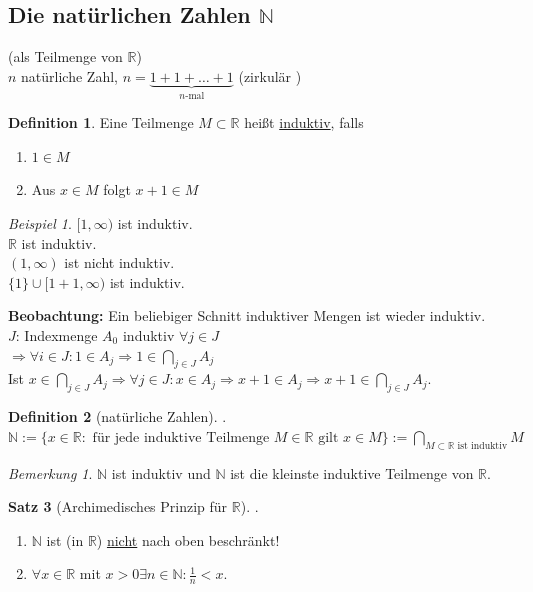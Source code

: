 \documentclass[12pt,a4paper,titlepage]{article} %
\theoremstyle{definition}
\newtheorem{satz}{Satz}[subsection]
\newtheorem{defi}[satz]{Definition}
\theoremstyle{remark}
\newtheorem*{bem}{Bemerkung}
\newtheorem*{bsp}{Beispiel}
\begin{document}
\subsection{Die natürlichen Zahlen $\mathbb{N}$}
(als Teilmenge von $\mathbb{R}$)\\
$n$ natürliche Zahl, $n=\underbrace{1+1+\ldots + 1}_{n\text{-mal}}$ (zirkulär \Lightning)
\begin{defi}
	Eine Teilmenge $M\subset \mathbb{R}$ heißt \underline{induktiv}, falls
	\begin{enumerate}
		\item $1\in M$
		\item Aus $x\in M$ folgt $x+1 \in M$
	\end{enumerate}
\end{defi}
\begin{bsp}
	$[1,\infty)$ ist induktiv.\\
	$\mathbb{R}$ ist induktiv.\\
	$(1,\infty)$ ist nicht induktiv.\\
	$\{1\} \cup [1+1,\infty)$ ist induktiv.
\end{bsp}
\textbf{Beobachtung:} Ein beliebiger Schnitt induktiver Mengen ist wieder induktiv.\\
$J$: Indexmenge $A_0$ induktiv $\forall j\in J$\\
$\Rightarrow \forall i\in J: 1\in A_j \Rightarrow 1\in \underset{j\in J}{\bigcap} A_j$\\
Ist $x\in \underset{j\in J}{\bigcap} A_j\Rightarrow \forall j \in J: x\in A_j \Rightarrow x+1 \in A_j \Rightarrow x+1 \in \underset{j\in J}{\bigcap} A_j$.
\begin{defi}[natürliche Zahlen] .\\ %
	$\mathbb{N} := \{x\in \mathbb{R}: \text{ für jede induktive Teilmenge } M\in\mathbb{R} \text{ gilt } x\in M\} := \underset{M\subset \mathbb{R}\text{ ist induktiv}}{\bigcap} M$
\end{defi}
\begin{bem}
	$\mathbb{N}$ ist induktiv und $\mathbb{N}$ ist die kleinste induktive Teilmenge von $\mathbb{R}$.
\end{bem}
\begin{satz}[Archimedisches Prinzip für $\mathbb{R}$] .%
	\begin{enumerate}
		\item $\mathbb{N}$ ist (in $\mathbb{R}$) \underline{nicht} nach oben beschränkt!
		\item $\forall x\in\mathbb{R}$ mit $x>0 \exists n\in \mathbb{N}: \frac{1}{n} < x$.
	\end{enumerate}
\end{satz}
\end{document}
